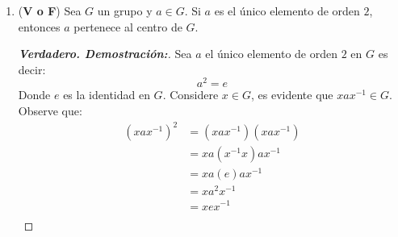 \documentclass[12pt]{article}
\begin{document}
\begin{enumerate}
\begin{proof}[\textbf{Demostración:}]
\begin{itemize}
        \begin{align*}
              \frac{x+e}{1+xe}&=x\\
              x+e&=x(1+xe)\\
              x+e&=x+x^2e\\
              0&=x^2e-e\\
              0&=e(x^2-1)
        \end{align*}
        Como $x\in(-1,1)$, $x\neq -1$ y $x\neq 1$ entonces $x^2-1\neq 0$. De esta forma $e=0\in(-1,1)=G$. Ahora note que:
        $$e\square x=0\square x=\frac{0+x}{1+0x}=\frac{x}{1}=x$$
        Así concluimos que si existe un elemento que actúa como neutro ya que para todo $x\in G$ se tiene que:
        $$x\square0=x=0\square x$$
        \item Todo elemento de $G$ tiene inverso. Para hallar ese inverso haremos un análisis similar al que hicimos para hallar el neutro. Tal inverso que llamaremos $x'$ debe cumplir que $x\square x'=0$. Luego:
        \begin{align*}
            \frac{x+x'}{1+xx'}&=0\\
            x+x'&=0\\
            x'&=-x
        \end{align*}
        Claramente $x'=-x\in G$ luego note que:
        $$-x\square x=\frac{-x+x}{1+(-x)(x)}=\frac{0}{1-x^2}=0$$
        De esta manera concluimos que para todo $x\in G$ existe un inverso tal que:
        $$x\square-x=0=-x\square x$$
    \end{itemize}
    De esta forma como hemos mostrado que se cumplen las tres condiciones podemos concluir que $(G,\square)$ es un grupo.
    \end{proof}
    \item (\textbf{V o F}) Sea $G$ un grupo y $a\in G$. Si $a$ es el único elemento de orden $2$, entonces $a$ pertenece al centro de $G$.
    \begin{proof}[\textbf{Verdadero. Demostración:}] Sea $a$ el único elemento de orden $2$ en $G$ es decir:
    $$a^2=e$$
    Donde $e$ es la identidad en $G$. Considere $x\in G$, es evidente que $xax^{-1}\in G$. Observe que:
    \begin{align*}
        (xax^{-1})^2&=(xax^{-1})(xax^{-1})\\
                    &=xa(x^{-1}x)ax^{-1}\\
                    &=xa(e)ax^{-1}\\
                    &=xa^2x^{-1}\\
                    &=xex^{-1}\\

\end{align*}
\end{proof}
\end{enumerate}
\end{document}

